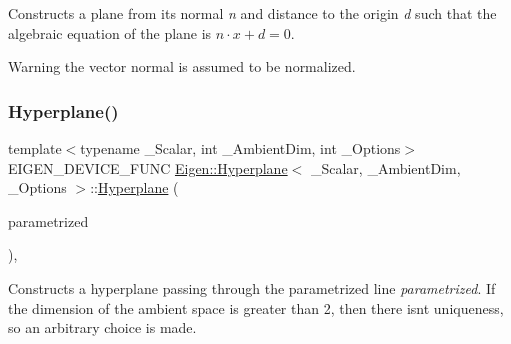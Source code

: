 Constructs a plane from its normal {\itshape n} and distance to the origin {\itshape d} such that the algebraic equation of the plane is $ n \cdot x + d = 0 $. \begin{DoxyWarning}{Warning}
the vector normal is assumed to be normalized. 
\end{DoxyWarning}
\mbox{\label{class_eigen_1_1_hyperplane_ab0096b58dd2a7d4e5c5d66e824c3b657}} 
\subsubsection{\texorpdfstring{Hyperplane()}{Hyperplane()}\hspace{0.1cm}{\footnotesize\ttfamily [5/6]}}
{\footnotesize\ttfamily template$<$typename \+\_\+\+Scalar, int \+\_\+\+Ambient\+Dim, int \+\_\+\+Options$>$ \\
E\+I\+G\+E\+N\+\_\+\+D\+E\+V\+I\+C\+E\+\_\+\+F\+U\+NC \mbox{\hyperlink{class_eigen_1_1_hyperplane}{Eigen\+::\+Hyperplane}}$<$ \+\_\+\+Scalar, \+\_\+\+Ambient\+Dim, \+\_\+\+Options $>$\+::\mbox{\hyperlink{class_eigen_1_1_hyperplane}{Hyperplane}} (\begin{DoxyParamCaption}\item[{const \mbox{\hyperlink{class_eigen_1_1_parametrized_line}{Parametrized\+Line}}$<$ Scalar, Ambient\+Dim\+At\+Compile\+Time $>$ \&}]{parametrized }\end{DoxyParamCaption})\hspace{0.3cm}{\ttfamily [inline]}, {\ttfamily [explicit]}}

Constructs a hyperplane passing through the parametrized line {\itshape parametrized}. If the dimension of the ambient space is greater than 2, then there isn\textquotesingle{}t uniqueness, so an arbitrary choice is made. \mbox{\label{class_eigen_1_1_hyperplane_ad4c2c28d6a4c74218c788094ed072264}} 
